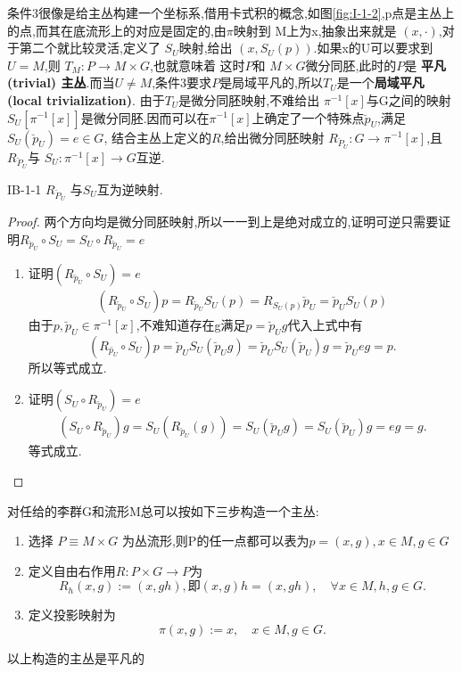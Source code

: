 \documentclass[../main.tex]{subfiles}
\begin{document}
 条件3很像是给主丛构建一个坐标系,借用卡式积的概念,如图\ref{fig:I-1-2},p点是主丛上的点,而其在底流形上的对应是固定的,由$\pi$映射到
 M上为x,抽象出来就是 $(x,\cdot)$,对于第二个就比较灵活,定义了 $S_U$映射,给出 $(x,S_U(p))$.如果x的U可以要求到$U = M$,则 $T_M : P \to M \times G$,也就意味着
 这时$P$和 $M\times G$微分同胚,此时的$P$是 \textbf{平凡(trivial) 主丛}.而当$U \neq M$,条件3要求$P$是局域平凡的,所以$T_U$是一个\textbf{局域平凡(local trivialization)}.
 由于$T_U$是微分同胚映射,不难给出 $\pi^{-1}[x]$与G之间的映射$S_U[\pi^{-1}[x]]$是微分同胚.因而可以在$\pi^{-1}[x]$上确定了一个特殊点$\breve{p}_U$,满足 $S_U(\breve{p}_U) = e \in G$, 结合主丛上定义的$R$,给出微分同胚映射 $R_{\breve{P}_U} : G \to \pi^{-1}[x]$,且$R_{\breve{P}_U}$与 $S_U:\pi^{-1}[x] \to G$互逆.
 \begin{theorem}
 {}{IB-1-1}
 $R_{\breve{P}_U}$ 与$S_U$互为逆映射.
 \end{theorem}
 \begin{proof}
 两个方向均是微分同胚映射,所以一一到上是绝对成立的,证明可逆只需要证明$R_{\breve{p}_U}\circ S_U = S_U\circ R_{\breve{p}_U} = e$
 \begin{enumerate}
 \item 证明$(R_{\breve{p}_U} \circ S_U) = e$
   \begin{align*}
 (R_{\breve{p}_U} \circ S_U)p = R_{\breve{p}_U}S_U(p) = R_{S_U(p)}\breve{p}_U  = \breve{p}_U S_U(p)  
 \end{align*}
 由于$p,\breve{p}_U \in  \pi^{-1}[x]$,不难知道存在g满足$p = \breve{p}_U g$代入上式中有 \[
   (R_{\breve{p_U}} \circ S_U)p = \breve{p}_U S_U(\breve{p}_U g) = \breve{p}_U S_U(\breve{p}_U)g = \breve{p}_Ueg = p
 .\] 
 所以等式成立.
\item 证明$(S_U \circ R_{\breve{p}_U}) = e$
 \begin{align*}
   (S_U \circ R_{\breve{p}_U}) g =S_U(R_{\breve{p}_U}(g)) = S_U(\breve{p}_U g) = S_U(\breve{p}_U)g = eg = g 
 .\end{align*}
 等式成立.
 \end{enumerate}
 \end{proof}
 \begin{example}
 \label{ex:I-1-1}
 对任给的李群G和流形M总可以按如下三步构造一个主丛:
 \begin{enumerate}
   \item 选择 $P \equiv M \times G$ 为丛流形,则P的任一点都可以表为$p = (x,g),x \in M, g \in G$ 
   \item 定义自由右作用$R: P \times G \to  P$为\[
       R_h(x,g) := (x,gh),\text{即}(x,g)h = (x,gh),\quad \forall x \in  M , h,g \in G  
   .\] 
 \item 定义投影映射为\[
\pi(x,g):= x, \quad x\in M,g\in G 
 .\] 
 \end{enumerate}
 以上构造的主丛是平凡的
 \end{example}
\end{document}
